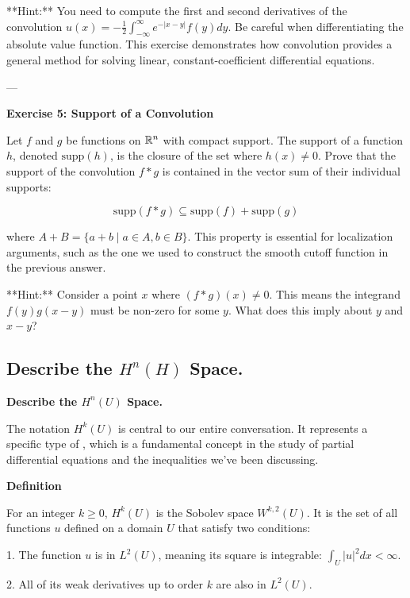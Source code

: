 \documentclass[12pt,a4paper]{report}
\begin{document}
\begin{description}
\begin{description}
**Hint:** You need to compute the first and second derivatives of the convolution \( u(x) = -\frac{1}{2} \int_{-\infty}^{\infty} e^{-|x-y|} f(y) dy \). Be careful when differentiating the absolute value function. This exercise demonstrates how convolution provides a general method for solving linear, constant-coefficient differential equations.

---

\item  \textbf{Exercise 5: Support of a Convolution}

Let \( f \) and \( g \) be functions on \( \mathbb{R}^n \) with compact support. The support of a function \( h \), denoted \( \text{supp}(h) \), is the closure of the set where \( h(x) \neq 0 \). Prove that the support of the convolution \( f * g \) is contained in the vector sum of their individual supports:

\[ \text{supp}(f * g) \subseteq \text{supp}(f) + \text{supp}(g) \]

where \( A+B = \{a+b \mid a \in A, b \in B\} \). This property is essential for localization arguments, such as the one we used to construct the smooth cutoff function in the previous answer.

**Hint:** Consider a point \( x \) where \( (f*g)(x) \neq 0 \). This means the integrand \( f(y)g(x-y) \) must be non-zero for some \( y \). What does this imply about \( y \) and \( x-y \)?

\end{description}

\HLINE

\newpage
\subsection*{Describe the $H^n(H)$ Space.}
\textbf{Describe the $H^n(U)$  Space.}

The notation \(H^k(U)\) is central to our entire conversation. It represents a specific type of , which is a fundamental concept in the study of partial differential equations and the inequalities we've been discussing.

\textbf{Definition}

For an integer \(k \ge 0\), \(H^k(U)\) is the Sobolev space \(W^{k,2}(U)\). It is the set of all functions \(u\) defined on a domain \(U\) that satisfy two conditions:

\begin{description}

\item 1.  The function \(u\) is in \(L^2(U)\), meaning its square is integrable: \(\int_U |u|^2 dx < \infty\).
\item 2.  All of its weak derivatives up to order \(k\) are also in \(L^2(U)\).


\end{description}
\end{description}
\end{document}
